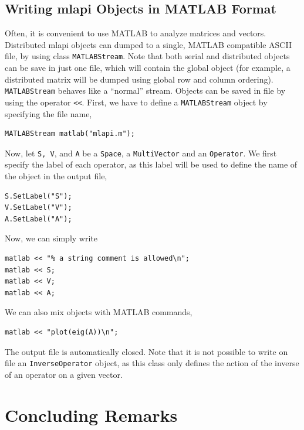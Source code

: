 \documentclass{article}[11pt]
\newcommand{\MLAPI}  {{\sc mlapi }}
\begin{document}
\subsection{Writing \MLAPI Objects in MATLAB Format}
\label{sec:matlab}

Often, it is convenient to use MATLAB to analyze matrices and
vectors. Distributed \MLAPI objects can dumped to a single, MATLAB compatible
ASCII file, by using class {\tt MATLABStream}.
Note that both serial and distributed objects 
can be save in just one file, which will contain the global object
(for example, a distributed matrix will be dumped using global row and
 column ordering). {\tt MATLABStream} behaves like a ``normal'' 
stream.  Objects can be saved in file by using the operator \verb!<<!.
First, we have to define a {\tt MATLABStream} object by specifying the
file name,
\begin{verbatim}
MATLABStream matlab("mlapi.m");
\end{verbatim}
Now, let {\tt S, V}, and {\tt A} be a {\tt Space}, a {\tt MultiVector}
and an {\tt Operator}. We first specify the label of each operator, as this
label will be used to define the name of the object in the output file,
\begin{verbatim}
S.SetLabel("S");
V.SetLabel("V");
A.SetLabel("A");
\end{verbatim}
Now, we can simply write
\begin{verbatim}
matlab << "% a string comment is allowed\n";
matlab << S;
matlab << V;
matlab << A;
\end{verbatim}
We can also mix objects with MATLAB commands,
\begin{verbatim}
matlab << "plot(eig(A))\n";
\end{verbatim}
The output file is automatically closed. Note that it is not possible to write
on file an {\tt InverseOperator} object, as this class only defines the
action of the inverse of an operator on a given vector.

\section{Concluding Remarks}
\label{sec:conclusions}
\end{document}

